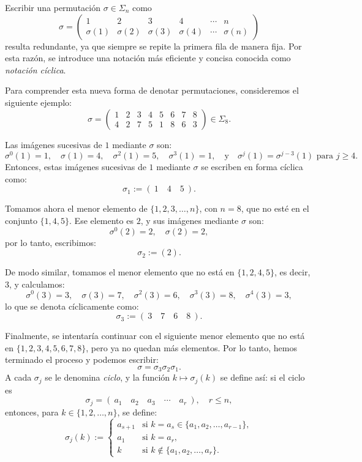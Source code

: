 Escribir una permutación \(\sigma \in \Sigma_n\) como  
\[
\sigma = \left(\begin{array}{ccccccc}
	1 & 2 & 3 & 4 & \cdots & n \\
	\sigma(1) & \sigma(2) & \sigma(3) & \sigma(4) & \cdots & \sigma(n)
\end{array}\right)
\]
resulta redundante, ya que siempre se repite la primera fila de manera fija. Por esta razón, se introduce una notación más eficiente y concisa conocida como \textit{notación cíclica}.

\medskip
\noindent Para comprender esta nueva forma de denotar permutaciones, consideremos el siguiente ejemplo:
\[
\sigma = \left(\begin{array}{cccccccc}
	1 & 2 & 3 & 4 & 5 & 6 & 7 & 8 \\
	4 & 2 & 7 & 5 & 1 & 8 & 6 & 3
\end{array}\right)\in \Sigma_8.
\]

\noindent Las imágenes sucesivas de \(1\) mediante \(\sigma\) son:
\[
\sigma^0(1) = 1,\quad \sigma(1) = 4,\quad \sigma^2(1) = 5,\quad \sigma^3(1) = 1,\quad \text{y} \quad \sigma^j(1) = \sigma^{j-3}(1)\text{ para }j \geq 4.
\]
Entonces, estas imágenes sucesivas de \(1\) mediante \(\sigma\) se escriben en forma cíclica como:
\[
\sigma_1 := (\:1\quad 4\quad 5\:).
\]

\noindent Tomamos ahora el menor elemento de \(\{1,2,3,\dots,n\}\), con \(n = 8\), que no esté en el conjunto \(\{1,4,5\}\). Ese elemento es \(2\), y sus imágenes mediante \(\sigma\) son:
\[
\sigma^0(2) = 2,\quad \sigma(2) = 2,
\]
por lo tanto, escribimos:
\[
\sigma_2 := (2).
\]

\noindent De modo similar, tomamos el menor elemento que no está en \(\{1,2,4,5\}\), es decir, \(3\), y calculamos:
\[
\sigma^0(3) = 3,\quad \sigma(3) = 7,\quad \sigma^2(3) = 6,\quad \sigma^3(3) = 8,\quad \sigma^4(3) = 3,
\]
lo que se denota cíclicamente como:
\[
\sigma_3 := (\:3\quad 7\quad 6\quad 8\:).
\]

\noindent Finalmente, se intentaría continuar con el siguiente menor elemento que no está en \(\{1,2,3,4,5,6,7,8\}\), pero ya no quedan más elementos. Por lo tanto, hemos terminado el proceso y podemos escribir:
\[
\sigma = \sigma_3 \sigma_2 \sigma_1.
\]
\noindent A cada \(\sigma_j\) se le denomina \emph{ciclo}, y la función \(k \mapsto \sigma_j(k)\) se define así: si el ciclo es
\[
\sigma_j = (\:a_1\quad a_2\quad a_3\quad\cdots\quad a_r\:), \quad r \leq n,
\]
entonces, para \(k \in \{1,2,\dots,n\}\), se define:
\[
\sigma_j(k) := \begin{cases}
	a_{s+1} & \text{si } k = a_s \in \{a_1, a_2, \dots, a_{r-1}\}, \\
	a_1     & \text{si } k = a_r, \\
	k       & \text{si } k \notin \{a_1, a_2, \dots, a_r\}.
\end{cases}
\]

